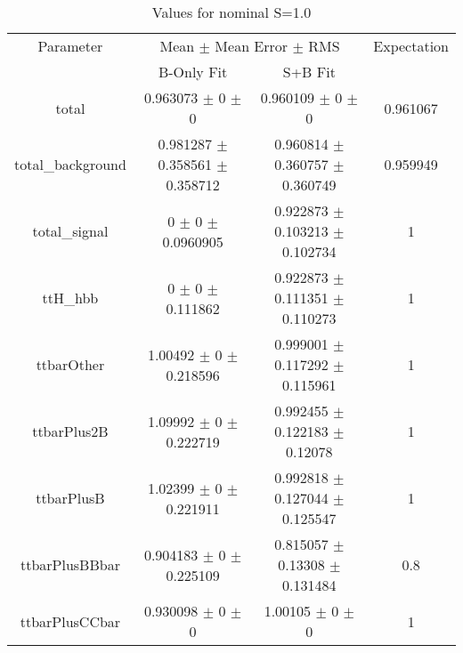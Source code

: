 \begin{table}
\centering
\caption{Values for nominal S=1.0}
\begin{tabular}{cccc}
\toprule
Parameter & \multicolumn{2}{c}{Mean $\pm$ Mean Error $\pm$ RMS} & Expectation\\
 & B-Only Fit & S+B Fit & \\
\midrule
total & \num{0.963073} $\pm$ \num{0} $\pm$ \num{0} & \num{0.960109} $\pm$ \num{0} $\pm$ \num{0} & \num{0.961067}\\
total\_background & \num{0.981287} $\pm$ \num{0.358561} $\pm$ \num{0.358712} & \num{0.960814} $\pm$ \num{0.360757} $\pm$ \num{0.360749} & \num{0.959949}\\
total\_signal & \num{0} $\pm$ \num{0} $\pm$ \num{0.0960905} & \num{0.922873} $\pm$ \num{0.103213} $\pm$ \num{0.102734} & \num{1}\\
ttH\_hbb & \num{0} $\pm$ \num{0} $\pm$ \num{0.111862} & \num{0.922873} $\pm$ \num{0.111351} $\pm$ \num{0.110273} & \num{1}\\
ttbarOther & \num{1.00492} $\pm$ \num{0} $\pm$ \num{0.218596} & \num{0.999001} $\pm$ \num{0.117292} $\pm$ \num{0.115961} & \num{1}\\
ttbarPlus2B & \num{1.09992} $\pm$ \num{0} $\pm$ \num{0.222719} & \num{0.992455} $\pm$ \num{0.122183} $\pm$ \num{0.12078} & \num{1}\\
ttbarPlusB & \num{1.02399} $\pm$ \num{0} $\pm$ \num{0.221911} & \num{0.992818} $\pm$ \num{0.127044} $\pm$ \num{0.125547} & \num{1}\\
ttbarPlusBBbar & \num{0.904183} $\pm$ \num{0} $\pm$ \num{0.225109} & \num{0.815057} $\pm$ \num{0.13308} $\pm$ \num{0.131484} & \num{0.8}\\
ttbarPlusCCbar & \num{0.930098} $\pm$ \num{0} $\pm$ \num{0} & \num{1.00105} $\pm$ \num{0} $\pm$ \num{0} & \num{1}\\
\bottomrule
\end{tabular}
\end{table}